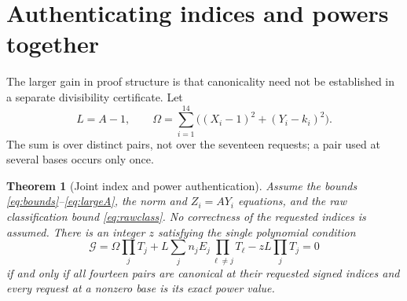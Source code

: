 \documentclass[11pt]{article}
\newtheorem{theorem}{Theorem}[section]
\theoremstyle{definition}\newtheorem{definition}[theorem]{Definition}
\begin{document}
\section{Authenticating indices and powers together}
\label{sec:joint}

The larger gain in proof structure is that canonicality need not be
established in a separate divisibility certificate. Let
\begin{equation}\label{eq:Omega}
 L=A-1,\qquad
 \Omega=\sum_{i=1}^{14}\bigl((X_i-1)^2+(Y_i-k_i)^2\bigr).
\end{equation}
The sum is over distinct pairs, not over the seventeen requests; a pair
used at several bases occurs only once.

\begin{theorem}[Joint index and power authentication]\label{thm:joint}
Assume the bounds \eqref{eq:bounds}--\eqref{eq:largeA}, the norm and
$Z_i=AY_i$ equations, and the raw classification bound \eqref{eq:rawclass}.
No correctness of the requested indices is assumed. There is an integer
$z$ satisfying the single polynomial condition
\begin{equation}\label{eq:G}
 \boxed{\mathcal G=
 \Omega\prod_jT_j+
 L\sum_j n_jE_j\prod_{\ell\ne j}T_\ell
       -zL\prod_jT_j=0}
\end{equation}
if and only if all fourteen pairs are canonical at their requested signed
indices and every request at a nonzero base is its exact power value.
\end{theorem}
\end{document}
